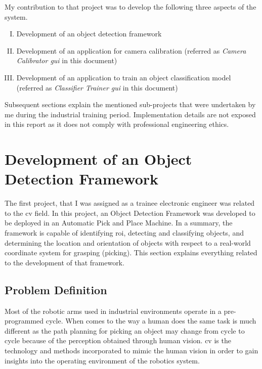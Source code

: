 \documentclass[a4paper,12pt]{report}%
\begin{document}
My contribution to that project was to develop the following three aspects of the system. 

\begin{enumerate}[I.]
	\item Development of an object detection framework
	
	\item Development of an application for camera calibration (referred as \textit{Camera Calibrator \ac{gui}} in this document)
	
	\item Development of an application to train an object classification model (referred as \textit{Classifier Trainer \ac{gui}} in this document)
	
\end{enumerate}

Subsequent sections explain the mentioned sub-projects that were undertaken by me during the industrial training period. Implementation details are not exposed in this report as it does not comply with professional engineering ethics.


\pagebreak
\section{Development of an Object Detection Framework}
\label{Development of an Object Detection Framework}
The first project, that I was assigned as a trainee electronic engineer was related to the \ac{cv} field. In this project, an Object Detection Framework was developed to be deployed in an Automatic Pick and Place Machine. In a summary, the framework is capable of identifying \ac{roi}, detecting and classifying objects, and determining the location and orientation of objects with respect to a real-world coordinate system for grasping (picking). This section explains everything related to the development of that framework.


\subsection{Problem Definition}\label{Problem Definition}
Most of the robotic arms used in industrial environments operate in a pre-programmed cycle. When comes to the way a human does the same task is much different as the path planning for picking an object may change from cycle to cycle because of the perception obtained through human vision. \Ac{cv} is the technology and methods incorporated to mimic the human vision in order to gain insights into the operating environment of the robotics system.\\
\end{document}
